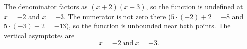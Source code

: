 The denominator factors as $(x+2)(x+3)$, so the function is undefined at $x=-2$ and $x=-3$. The numerator is not zero there ($5\cdot(-2)+2=-8$ and $5\cdot(-3)+2=-13$), so the function is unbounded near both points. The vertical asymptotes are
\[\boxed{x=-2\ \text{and}\ x=-3}.\]
